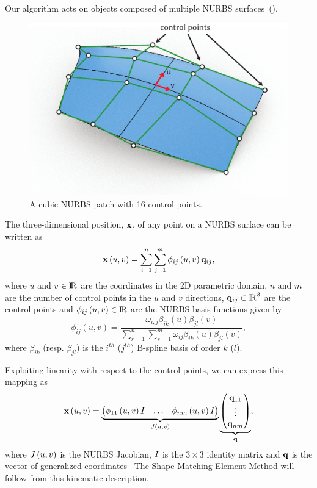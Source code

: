 Our algorithm acts on objects composed of multiple NURBS surfaces~().
\begin{figure}[h]
    \includegraphics[width=\columnwidth]{figures/nurbs_patch}
    \caption{A cubic NURBS patch with 16 control points.}
    \label{fig:NURBS}
\end{figure}
The three-dimensional position, $\mathbf{x}$, of any point on a NURBS surface can be written as 
\begin{equation}
\label{eqn:nurbs_srf}
\mathbf{x}\left(u,v\right) = \sum_{i=1}^n\sum_{j=1}^m \phi_{ij}\left(u,v\right)\mathbf{q}_{ij},
\end{equation}
where $u$ and $v$ $\in {\rm I\!R}$ are the coordinates in the 2D parametric domain, $n$ and $m$ are the number of control points in the $u$ and $v$ directions, $\mathbf{q}_{ij}\in{\rm I\!R}^3$ are the control points and $\phi_{ij}\left(u,v\right)\in{\rm I\!R}$ are the NURBS
basis functions given by 
\begin{equation*}
    \phi_{ij}\left(u,v\right) = \frac{\omega_{i,j}\beta_{ik}(u)\beta_{jl}(v)}{\sum_{r=1}^{n}\sum_{s=1}^{m} \omega_{ij} \beta_{ik}(u)\beta_{jl}(v)},
\end{equation*} where $\beta_{ik}$ (resp. $\beta_{jl}$) is the $i^{th}$ ($j^{th}$) B-spline basis of order $k$ ($l$).

Exploiting linearity with respect to the control points, we can express this mapping as
\begin{equation}
    \mathbf{x}\left(u,v\right) = \underbrace{\begin{pmatrix} \phi_{11}\left(u,v\right)I & \dots & \phi_{nm}\left(u,v\right)I \end{pmatrix}}_{J\left(u,v\right)}
    \underbrace{\begin{pmatrix} \mathbf{q}_{11} \\ \vdots \\ \mathbf{q}_{nm}\end{pmatrix}}_{\mathbf{q}},
\end{equation} where $J\left(u,v\right)$ is the NURBS Jacobian, $I$ is the $3\times3$ identity matrix and $\mathbf{q}$ is the vector of generalized coordinates~\cite{lanczos2012variational}
The Shape Matching Element Method will follow from this kinematic description.

